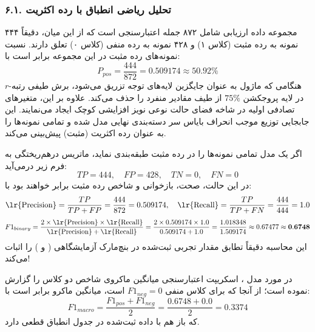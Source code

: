\subsubsection*{۶.۱. تحلیل ریاضی انطباق با رده اکثریت }
مجموعه داده ارزیابی  شامل ۸۷۲ جمله اعتبارسنجی است که از این میان، دقیقاً ۴۴۴ نمونه به رده مثبت (کلاس ۱) و ۴۲۸ نمونه به رده منفی (کلاس ۰) تعلق دارند. نسبت نمونه‌های رده مثبت در این مجموعه برابر است با:
\begin{equation}
P_{pos} = \frac{444}{872} = 0.509174 \approx 50.92\%
\end{equation}
هنگامی که ماژول  به عنوان جایگزین لایه‌های توجه تزریق می‌شود، برش طیفی رتبه-$r$ در لایه پروجکشن $75\%$ از طیف مقادیر منفرد را حذف می‌کند. علاوه بر این، متغیرهای تصادفی اولیه در شاخه فضای حالت  نوعی نویز افزایشی کوچک ایجاد می‌نمایند. این جابجایی توزیع موجب انحراف بایاس سر دسته‌بندی نهایی مدل شده و تمامی نمونه‌ها را به عنوان رده اکثریت (مثبت) پیش‌بینی می‌کند. 

اگر یک مدل تمامی نمونه‌ها را در رده مثبت طبقه‌بندی نماید، ماتریس درهم‌ریختگی به فرم زیر درمی‌آید:
\begin{equation}
TP = 444, \quad FP = 428, \quad TN = 0, \quad FN = 0
\end{equation}
در این حالت، صحت، بازخوانی و شاخص  رده مثبت برابر خواهند بود با:
\begin{equation}
\text{\lr{Precision}} = \frac{TP}{TP + FP} = \frac{444}{872} = 0.509174, \quad \text{\lr{Recall}} = \frac{TP}{TP + FN} = \frac{444}{444} = 1.0
\end{equation}
\begin{equation}
F1_{binary} = \frac{2 \times \text{\lr{Precision}} \times \text{\lr{Recall}}}{\text{\lr{Precision}} + \text{\lr{Recall}}} = \frac{2 \times 0.509174 \times 1.0}{0.509174 + 1.0} = \frac{1.018348}{1.509174} \approx 0.67477 \approx \mathbf{0.6748}
\end{equation}
این محاسبه دقیقاً تطابق مقدار تجربی ثبت‌شده در بنچ‌مارک آزمایشگاهی ( و ) را اثبات می‌کند! 

در مورد مدل ، اسکریپت اعتبارسنجی میانگین ماکروی شاخص  دو کلاس را گزارش نموده است؛ از آنجا که برای کلاس منفی $F1_{neg} = 0$ است، میانگین ماکرو برابر است با:
\begin{equation}
F1_{macro} = \frac{F1_{pos} + F1_{neg}}{2} = \frac{0.6748 + 0.0}{2} = \mathbf{0.3374}
\end{equation}
که باز هم با داده ثبت‌شده در جدول  انطباق قطعی دارد.

